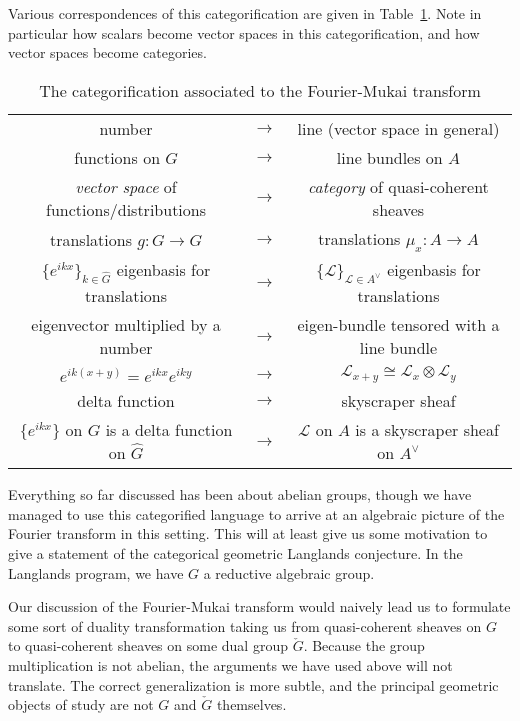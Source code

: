 Various correspondences of this categorification are given in Table~\ref{tab:fourier_mukai}. Note in particular how scalars become vector spaces in this categorification, and how vector spaces become categories. 
\begin{table}
	\centering
	\begin{tabular}{c c  c}
		number & $\to$ & line (vector space in general)\\
		functions on $G$ & $\to$ & line bundles on $A$\\
		\emph{vector space} of functions/distributions & $\to$ & \emph{category} of quasi-coherent sheaves\\
		translations $g: G \to G$ & $\to$ & translations $\mu_x: A \to A$\\
		$\{e^{ikx}\}_{k \in \hat G}$ eigenbasis for translations & $\to$ & $
		\{\mathcal L\}_{\mathcal L \in A^\vee}$ eigenbasis for translations\\
		eigenvector multiplied by a number & $\to$ & eigen-bundle tensored with a line bundle\\
		$e^{ik(x+y)} = e^{ikx} e^{iky}$ & $\to$ & $\mathcal L_{x+y} \cong \mathcal L_x \otimes \mathcal L_y$\\
		delta function & $\to$ & skyscraper sheaf\\
		$\{e^{ikx}\}$ on $G$ is a delta function on $\hat G$ & $\to$ & $\mathcal L$ on $A$ is a skyscraper sheaf on $A^\vee$
	\end{tabular}
	\caption{The categorification associated to the Fourier-Mukai transform}
	\label{tab:fourier_mukai}
\end{table}
 
Everything so far discussed has been about abelian groups, though we have managed to use this categorified language to arrive at an algebraic picture of the Fourier transform in this setting. This will at least give us some motivation to give a statement of the categorical geometric Langlands conjecture. In the Langlands program, we have $G$ a reductive algebraic group. 

Our discussion of the Fourier-Mukai transform would naively lead us to formulate some sort of duality transformation taking us from quasi-coherent sheaves on $G$ to quasi-coherent sheaves on some dual group $\check G$. Because the group multiplication is not abelian, the arguments we have used above will not translate. The correct generalization is more subtle, and the principal geometric objects of study are not $G$ and $\check G$ themselves.

